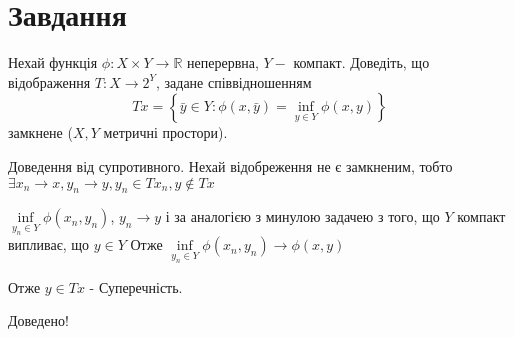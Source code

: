 
\chapter{Завдання \theHchapter}

\begin{tcolorbox}[title=Завдання]
    Нехай функція $\phi: X \times Y \rightarrow \mathbb{R}$ неперервна, 
    $Y-$ компакт. 
    Доведіть, що відображення $T: X \rightarrow 2^{Y}$, 
    задане співвідношенням
    $$T x=\left\{\bar{y} \in Y: \phi(x, \bar{y})=
    \inf _{y \in Y} \phi(x, y)\right\}$$
    замкнене ($X, Y$ метричні простори).
\end{tcolorbox}



Доведення від супротивного. Нехай відобреження не є замкненим, тобто
$\exists x_n \rightarrow x, y_n \rightarrow y, y_n \in Tx_n, y \notin Tx$


$\inf\limits_{y_n \in Y} \phi(x_n, y_n)$, $y_n \rightarrow y$ і за 
аналогією з минулою задачею з того, що $Y$ компакт випливає, що $y \in Y$ 
Отже $\inf\limits_{y_n \in Y} \phi(x_n, y_n) \rightarrow \phi(x, y)$ 


Отже $y \in Tx$ - Суперечність.


Доведено!

